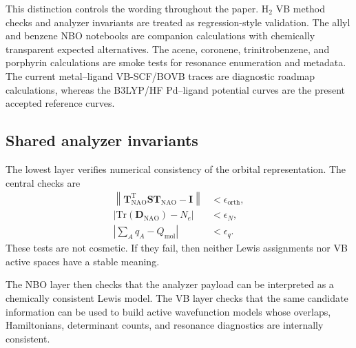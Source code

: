 \documentclass[11pt]{article}
\newcommand{\nao}{\mathrm{NAO}}
\newcommand{\dens}{\mathbf{D}}
\begin{document}
This distinction controls the wording throughout the paper.  H$_2$ VB method checks and analyzer invariants are treated as regression-style validation.  The allyl and benzene NBO notebooks are companion calculations with chemically transparent expected alternatives.  The acene, coronene, trinitrobenzene, and porphyrin calculations are smoke tests for resonance enumeration and metadata.  The current metal--ligand VB-SCF/BOVB traces are diagnostic roadmap calculations, whereas the B3LYP/HF Pd--ligand potential curves are the present accepted reference curves.

\subsection{Shared analyzer invariants}

The lowest layer verifies numerical consistency of the orbital representation.  The central checks are
\begin{equation}
\begin{aligned}
	\left\|\mathbf{T}_{\nao}^{\mathrm{T}}\mathbf{S}\mathbf{T}_{\nao}-\mathbf{I}\right\| &< \epsilon_{\mathrm{orth}}, \\
	\left|\mathrm{Tr}\left(\dens_{\nao}\right)-N_e\right| &< \epsilon_N, \\
	\left|\sum_A q_A-Q_{\mathrm{mol}}\right| &< \epsilon_q.
\end{aligned}
\end{equation}
These tests are not cosmetic.  If they fail, then neither Lewis assignments nor VB active spaces have a stable meaning.

The NBO layer then checks that the analyzer payload can be interpreted as a chemically consistent Lewis model.  The VB layer checks that the same candidate information can be used to build active wavefunction models whose overlaps, Hamiltonians, determinant counts, and resonance diagnostics are internally consistent.
\end{document}
